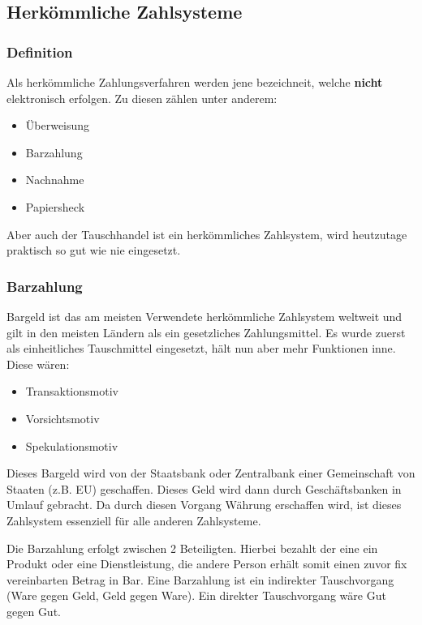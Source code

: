 
\subsection{Herkömmliche Zahlsysteme}
\subsubsection{Definition}
Als herkömmliche Zahlungsverfahren werden jene bezeichneit, welche \textbf{nicht} elektronisch erfolgen. Zu diesen zählen unter anderem:
\begin{itemize}
	\item Überweisung
	\item Barzahlung
	\item Nachnahme
	\item Papiersheck
\end{itemize}
Aber auch der Tauschhandel ist ein herkömmliches Zahlsystem, wird heutzutage praktisch so gut wie nie eingesetzt.

\subsubsection{Barzahlung}
Bargeld ist das am meisten Verwendete herkömmliche Zahlsystem weltweit und gilt in den meisten Ländern als ein gesetzliches Zahlungsmittel. Es wurde zuerst als einheitliches Tauschmittel eingesetzt, hält nun aber mehr Funktionen inne. Diese wären:
\begin{itemize}
	\item Transaktionsmotiv
	\item Vorsichtsmotiv
	\item Spekulationsmotiv
\end{itemize}
Dieses Bargeld wird von der Staatsbank oder Zentralbank einer Gemeinschaft von Staaten (z.B. EU) geschaffen. Dieses Geld wird dann durch Geschäftsbanken in Umlauf gebracht.
Da durch diesen Vorgang Währung erschaffen wird, ist dieses Zahlsystem essenziell für alle anderen Zahlsysteme.


Die Barzahlung erfolgt zwischen 2 Beteiligten. Hierbei bezahlt der eine ein Produkt oder eine Dienstleistung, die andere Person erhält somit einen zuvor fix vereinbarten Betrag in Bar.
Eine Barzahlung ist ein indirekter Tauschvorgang (Ware gegen Geld, Geld gegen Ware). Ein direkter Tauschvorgang wäre Gut gegen Gut.

